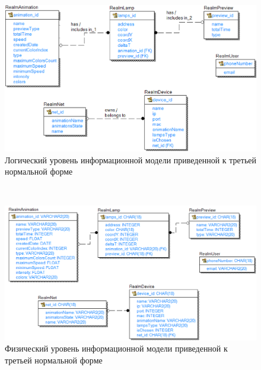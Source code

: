 \newpage
{}
\label{app:er}

~
\begin{figure}[H]
\centering
	\includegraphics[scale=0.6]{figures/diagrams/er_diagram_logic.png}
	\caption{Логический уровень информационной модели приведенной к третьей нормальной форме}
	\label{fig:appendices:er}
\end{figure}

\newpage
~
\begin{figure}[H]
\centering
	\includegraphics[scale=0.6]{figures/diagrams/er_diagram_physical.png}
	\caption{Физический уровень информационной модели приведенной к третьей нормальной форме}
	\label{fig:appendices:er}
\end{figure}